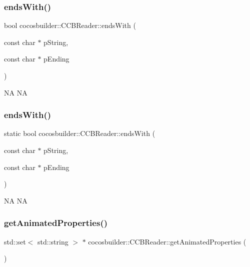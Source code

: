 \subsubsection{\texorpdfstring{ends\+With()}{endsWith()}\hspace{0.1cm}{\footnotesize\ttfamily [1/2]}}
{\footnotesize\ttfamily bool cocosbuilder\+::\+C\+C\+B\+Reader\+::ends\+With (\begin{DoxyParamCaption}\item[{const char $\ast$}]{p\+String,  }\item[{const char $\ast$}]{p\+Ending }\end{DoxyParamCaption})\hspace{0.3cm}{\ttfamily [static]}}

NA  NA \mbox{\label{classcocosbuilder_1_1CCBReader_a1db8b384e8c21c3492e6425c883e9cd3}} 
\subsubsection{\texorpdfstring{ends\+With()}{endsWith()}\hspace{0.1cm}{\footnotesize\ttfamily [2/2]}}
{\footnotesize\ttfamily static bool cocosbuilder\+::\+C\+C\+B\+Reader\+::ends\+With (\begin{DoxyParamCaption}\item[{const char $\ast$}]{p\+String,  }\item[{const char $\ast$}]{p\+Ending }\end{DoxyParamCaption})\hspace{0.3cm}{\ttfamily [static]}}

NA  NA \mbox{\label{classcocosbuilder_1_1CCBReader_a8a5c5a338b4bc06d735536e735f46219}} 
\subsubsection{\texorpdfstring{get\+Animated\+Properties()}{getAnimatedProperties()}\hspace{0.1cm}{\footnotesize\ttfamily [1/2]}}
{\footnotesize\ttfamily std\+::set$<$ std\+::string $>$ $\ast$ cocosbuilder\+::\+C\+C\+B\+Reader\+::get\+Animated\+Properties (\begin{DoxyParamCaption}{ }\end{DoxyParamCaption})}

